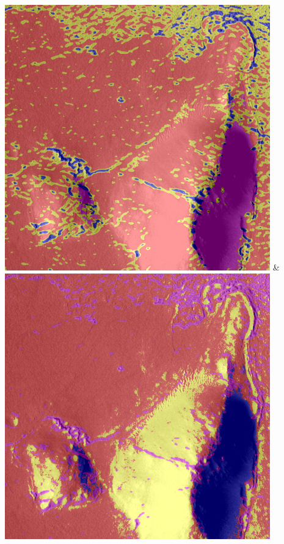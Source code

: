 \begin{table}[h!]
\begin{tabularx}{\textwidth}
		\includegraphics[width=0.9\linewidth]{images/gen/color_weight/p03_04.png_1.33.png} &
		\includegraphics[width=0.9\linewidth]{images/gen/color_weight/p03_04.png_1.66.png} \\
		\bottomrule
	\end{tabularx}
	\caption{Vergleich verschiedener Gewichtungen der Farb- \bzw Helligkeitswerte beim Clustering der jeweiligen Eingabedateien. Die Farben der jeweilgen Cluster wurden zufällig gewählt. Alle Bilder wurden in vier Cluster eingeteilt.}
	\label{tab:filterbank_weights_col}
\end{table}

